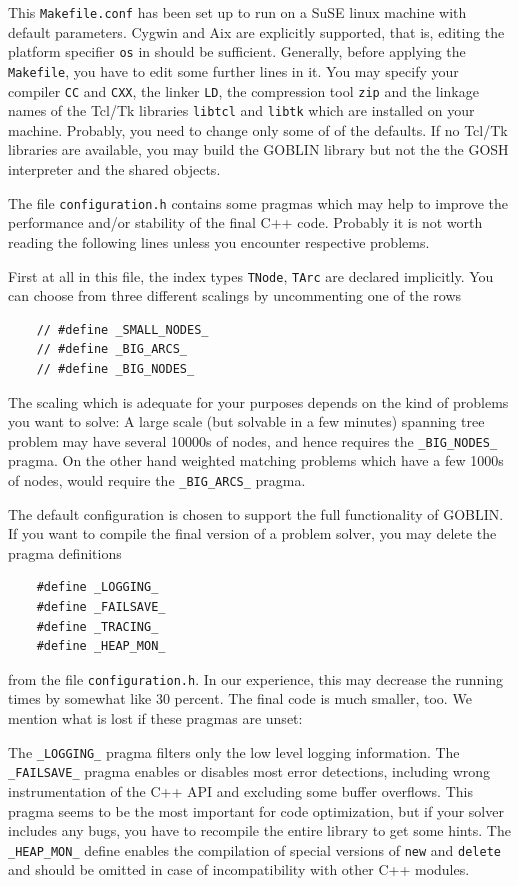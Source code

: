 \documentclass[a4paper,11pt,twoside]{book}
\begin{document}
\begin{multicols}{2}
This \verb/Makefile.conf/ has been set up to run on a SuSE linux machine with
default parameters. Cygwin and Aix are explicitly supported, that is, editing
the platform specifier \verb/os/ in should be sufficient. Generally, before
applying the \verb/Makefile/, you have to edit some further lines in it. You
may specify your compiler \verb/CC/ and \verb/CXX/, the linker \verb/LD/, the
compression tool \verb/zip/ and the linkage names of the Tcl/Tk libraries
\verb/libtcl/ and \verb/libtk/ which are installed on your machine. Probably,
you need to change only some of of the defaults. If no Tcl/Tk libraries are
available, you may build the GOBLIN library but not the the GOSH interpreter
and the shared objects.

The file \verb/configuration.h/ contains some pragmas which may help to improve
the performance and/or stability of the final C++ code. Probably it is not
worth reading the following lines unless you encounter respective problems.

First at all in this file, the index types \verb/TNode/, \verb/TArc/ are
declared implicitly. You can choose from three different scalings
by uncommenting one of the rows
\begin{verbatim}
    // #define _SMALL_NODES_
    // #define _BIG_ARCS_
    // #define _BIG_NODES_
\end{verbatim}
The scaling which is adequate for your purposes depends on the kind of
problems you want to solve: A large scale (but solvable in a few minutes)
spanning tree problem may have several 10000s of nodes, and hence requires the
\verb/_BIG_NODES_/ pragma. On the other hand weighted matching problems
which have a few 1000s of nodes, would require the \verb/_BIG_ARCS_/
pragma.

The default configuration is chosen to support the full functionality of GOBLIN.
If you want to compile the final version of a problem solver, you may delete
the pragma definitions
\begin{verbatim}
    #define _LOGGING_
    #define _FAILSAVE_
    #define _TRACING_
    #define _HEAP_MON_
\end{verbatim}
from the file \verb/configuration.h/.
In our experience, this may decrease the running times by somewhat like 30
percent. The final code is much smaller, too. We mention what is lost if these
pragmas are unset:

The \verb/_LOGGING_/ pragma filters only the low level logging information.
The \verb/_FAILSAVE_/ pragma enables or disables most error detections,
including wrong instrumentation of the C++ API and excluding some buffer
overflows. This pragma seems to be the most important for code optimization,
but if your solver includes any bugs, you have to recompile the entire library
to get some hints. The \verb/_HEAP_MON_/ define enables the compilation of
special versions of \verb/new/ and \verb/delete/ and should be omitted in case
of incompatibility with other C++ modules.


\end{multicols}
\end{document}

